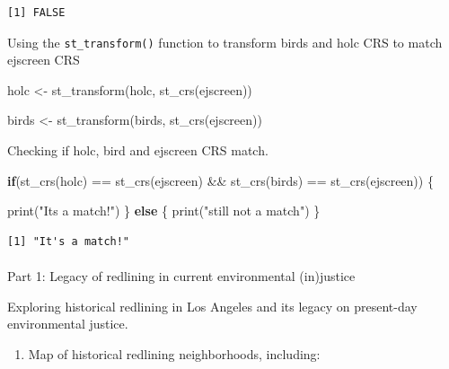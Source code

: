 \documentclass[
  letterpaper,
  DIV=11,
  numbers=noendperiod]{scrartcl}
\makeatletter
\let\oldparagraph\paragraph
\renewcommand{\paragraph}{
    \@ifstar
      \xxxParagraphStar
      \xxxParagraphNoStar
  }
\newcommand{\xxxParagraphStar}[1]{\oldparagraph*{#1}\mbox{}}
\newcommand{\xxxParagraphNoStar}[1]{\oldparagraph{#1}\mbox{}}
\newenvironment{Shaded}{\begin{snugshade}}{\end{snugshade}}
\newcommand{\ControlFlowTok}[1]{\textcolor[rgb]{0.00,0.23,0.31}{\textbf{#1}}}
\newcommand{\FunctionTok}[1]{\textcolor[rgb]{0.28,0.35,0.67}{#1}}
\newcommand{\NormalTok}[1]{\textcolor[rgb]{0.00,0.23,0.31}{#1}}
\newcommand{\OtherTok}[1]{\textcolor[rgb]{0.00,0.23,0.31}{#1}}
\newcommand{\SpecialCharTok}[1]{\textcolor[rgb]{0.37,0.37,0.37}{#1}}
\newcommand{\StringTok}[1]{\textcolor[rgb]{0.13,0.47,0.30}{#1}}
\providecommand{\tightlist}{%
  \setlength{\itemsep}{0pt}\setlength{\parskip}{0pt}}\usepackage{longtable,booktabs,array}
\makeatother
\begin{document}
\begin{verbatim}
[1] FALSE
\end{verbatim}

Using the \texttt{st\_transform()} function to transform birds and holc
CRS to match ejscreen CRS

\begin{Shaded}
\begin{Highlighting}[]
\NormalTok{holc }\OtherTok{\textless{}{-}} \FunctionTok{st\_transform}\NormalTok{(holc, }\FunctionTok{st\_crs}\NormalTok{(ejscreen))}

\NormalTok{birds }\OtherTok{\textless{}{-}} \FunctionTok{st\_transform}\NormalTok{(birds, }\FunctionTok{st\_crs}\NormalTok{(ejscreen))}
\end{Highlighting}
\end{Shaded}

Checking if holc, bird and ejscreen CRS match.

\begin{Shaded}
\begin{Highlighting}[]
\ControlFlowTok{if}\NormalTok{(}\FunctionTok{st\_crs}\NormalTok{(holc) }\SpecialCharTok{==} \FunctionTok{st\_crs}\NormalTok{(ejscreen) }\SpecialCharTok{\&\&}
   \FunctionTok{st\_crs}\NormalTok{(birds) }\SpecialCharTok{==} \FunctionTok{st\_crs}\NormalTok{(ejscreen)) \{}
  
  \FunctionTok{print}\NormalTok{(}\StringTok{"It\textquotesingle{}s a match!"}\NormalTok{)}
\NormalTok{\} }\ControlFlowTok{else}\NormalTok{ \{}
    \FunctionTok{print}\NormalTok{(}\StringTok{"still not a match"}\NormalTok{)}
\NormalTok{  \}}
\end{Highlighting}
\end{Shaded}

\begin{verbatim}
[1] "It's a match!"
\end{verbatim}

\paragraph{Part 1: Legacy of redlining in current environmental
(in)justice}\label{part-1-legacy-of-redlining-in-current-environmental-injustice}

Exploring historical redlining in Los Angeles and its legacy on
present-day environmental justice.

\begin{enumerate}
\def\labelenumi{\arabic{enumi}.}
\tightlist
\item
  Map of historical redlining neighborhoods, including:
\end{enumerate}
\end{document}
